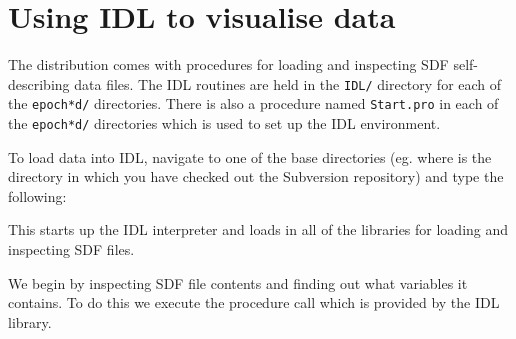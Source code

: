 \section{Using IDL to visualise data}
\label{sec:idl}

  The {\EPOCH} distribution comes with procedures for loading and inspecting
  SDF self-describing data files.
  The IDL routines are held in the {\tt IDL/} directory
  for each of the {\tt epoch*d/} directories. There is also a procedure
  named {\tt Start.pro} in each of the {\tt epoch*d/} directories which is
  used to set up the IDL environment.

  To load data into IDL, navigate to one of the base directories (eg.
   where  is the directory in which you
  have checked out the Subversion repository) and type
  the following:


  This starts up the IDL interpreter and loads in all of the libraries
  for loading and inspecting SDF files.

  We begin by inspecting SDF file contents and finding out what variables
  it contains. To do this we execute the  procedure call
  which is provided by the {\EPOCH} IDL library.

